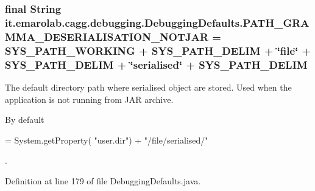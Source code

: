 \hypertarget{classit_1_1emarolab_1_1cagg_1_1debugging_1_1DebuggingDefaults_a8cf820f63cd9d9288cea388c2b44e585}{
\subsubsection[{P\-A\-T\-H\-\_\-\-G\-R\-A\-M\-M\-A\-\_\-\-D\-E\-S\-E\-R\-I\-A\-L\-I\-S\-A\-T\-I\-O\-N\-\_\-\-N\-O\-T\-J\-A\-R}]{\setlength{\rightskip}{0pt plus 5cm}final String it.\-emarolab.\-cagg.\-debugging.\-Debugging\-Defaults.\-P\-A\-T\-H\-\_\-\-G\-R\-A\-M\-M\-A\-\_\-\-D\-E\-S\-E\-R\-I\-A\-L\-I\-S\-A\-T\-I\-O\-N\-\_\-\-N\-O\-T\-J\-A\-R = {\bf S\-Y\-S\-\_\-\-P\-A\-T\-H\-\_\-\-W\-O\-R\-K\-I\-N\-G} + {\bf S\-Y\-S\-\_\-\-P\-A\-T\-H\-\_\-\-D\-E\-L\-I\-M} + \char`\"{}file\char`\"{} + S\-Y\-S\-\_\-\-P\-A\-T\-H\-\_\-\-D\-E\-L\-I\-M + \char`\"{}serialised\char`\"{} + S\-Y\-S\-\_\-\-P\-A\-T\-H\-\_\-\-D\-E\-L\-I\-M\hspace{0.3cm}{\ttfamily [static]}}}\label{classit_1_1emarolab_1_1cagg_1_1debugging_1_1DebuggingDefaults_a8cf820f63cd9d9288cea388c2b44e585}
The default directory path where serialised object are stored. Used when the application is not running from J\-A\-R archive.\par
 By default
\begin{DoxyCode}
= System.getProperty( \textcolor{stringliteral}{"user.dir"}) + \textcolor{stringliteral}{"/file/serialised/"} 
\end{DoxyCode}
 . 

Definition at line 179 of file Debugging\-Defaults.\-java.

